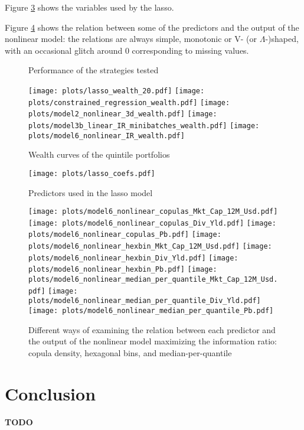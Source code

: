 \documentclass[12pt]{article}
\begin{document}
Figure \ref{fig:lasso-coef} shows the variables used by the lasso.

Figure \ref{fig:non-linear} shows the relation between some of the predictors and
the output of the nonlinear model: 
the relations are always simple, monotonic or V- (or $\Lambda$-)shaped,
with an occasional glitch around 0 corresponding to missing values. 

\begin{figure}[htbp]
\centering

\caption{Performance of the strategies tested}
\label{fig:perf}
\end{figure}

\begin{figure}[htbp]
\centering
\texttt{[image: plots/lasso\_wealth\_20.pdf]}%
\texttt{[image: plots/constrained\_regression\_wealth.pdf]}
\texttt{[image: plots/model2\_nonlinear\_3d\_wealth.pdf]}%
\texttt{[image: plots/model3b\_linear\_IR\_minibatches\_wealth.pdf]}
\texttt{[image: plots/model6\_nonlinear\_IR\_wealth.pdf]}%
\caption{Wealth curves of the quintile portfolios}
\label{fig:wealth-curves}
\end{figure}

\begin{figure}[htbp]
\centering
\texttt{[image: plots/lasso\_coefs.pdf]}%
\caption{Predictors used in the lasso model}
\label{fig:lasso-coef}
\end{figure}

\begin{figure}[htbp]
\centering
\texttt{[image: plots/model6\_nonlinear\_copulas\_Mkt\_Cap\_12M\_Usd.pdf]}%
\texttt{[image: plots/model6\_nonlinear\_copulas\_Div\_Yld.pdf]}%
\texttt{[image: plots/model6\_nonlinear\_copulas\_Pb.pdf]}
\texttt{[image: plots/model6\_nonlinear\_hexbin\_Mkt\_Cap\_12M\_Usd.pdf]}%
\texttt{[image: plots/model6\_nonlinear\_hexbin\_Div\_Yld.pdf]}%
\texttt{[image: plots/model6\_nonlinear\_hexbin\_Pb.pdf]}
\texttt{[image: plots/model6\_nonlinear\_median\_per\_quantile\_Mkt\_Cap\_12M\_Usd.pdf]}%
\texttt{[image: plots/model6\_nonlinear\_median\_per\_quantile\_Div\_Yld.pdf]}%
\texttt{[image: plots/model6\_nonlinear\_median\_per\_quantile\_Pb.pdf]}
\caption{Different ways of examining the relation between each predictor and the output
of the nonlinear model maximizing the information ratio: copula density, hexagonal bins, 
and median-per-quantile}
\label{fig:non-linear}
\end{figure}

\clearpage
\section{Conclusion}

\textbf{TODO}


\clearpage
\nocite{*}


\end{document}
